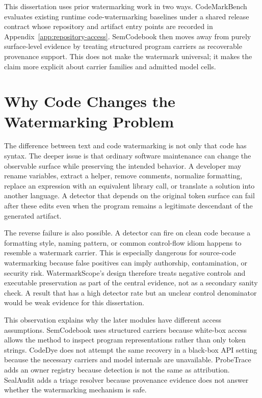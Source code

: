 This dissertation uses prior watermarking work in two ways. CodeMarkBench evaluates existing runtime code-watermarking baselines under a shared release contract whose repository and artifact entry points are recorded in Appendix~\ref{app:repository-access}. SemCodebook then moves away from purely surface-level evidence by treating structured program carriers as recoverable provenance support. This does not make the watermark universal; it makes the claim more explicit about carrier families and admitted model cells.

\section{Why Code Changes the Watermarking Problem}

The difference between text and code watermarking is not only that code has syntax. The deeper issue is that ordinary software maintenance can change the observable surface while preserving the intended behavior. A developer may rename variables, extract a helper, remove comments, normalize formatting, replace an expression with an equivalent library call, or translate a solution into another language. A detector that depends on the original token surface can fail after these edits even when the program remains a legitimate descendant of the generated artifact.

The reverse failure is also possible. A detector can fire on clean code because a formatting style, naming pattern, or common control-flow idiom happens to resemble a watermark carrier. This is especially dangerous for source-code watermarking because false positives can imply authorship, contamination, or security risk. WatermarkScope's design therefore treats negative controls and executable preservation as part of the central evidence, not as a secondary sanity check. A result that has a high detector rate but an unclear control denominator would be weak evidence for this dissertation.

This observation explains why the later modules have different access assumptions. SemCodebook uses structured carriers because white-box access allows the method to inspect program representations rather than only token strings. CodeDye does not attempt the same recovery in a black-box API setting because the necessary carriers and model internals are unavailable. ProbeTrace adds an owner registry because detection is not the same as attribution. SealAudit adds a triage resolver because provenance evidence does not answer whether the watermarking mechanism is safe.

